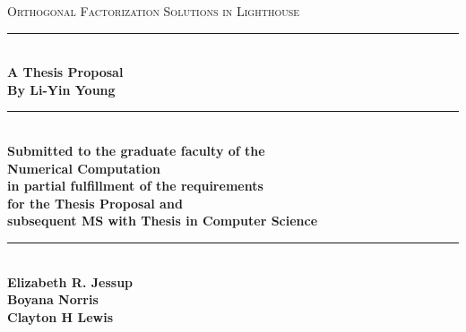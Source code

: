\documentclass[pdftex,12pt,a4paper]{article}
\newcommand{\HRule}{\rule{\linewidth}{0.2mm}}
\begin{document}
   \begin{titlepage}
        \begin{center}

\vfill
\vfill
\textsc{\Large Orthogonal Factorization Solutions in Lighthouse}\\[0.5cm]

\HRule \\[0.4cm]
{ \bfseries A Thesis Proposal \\By Li-Yin Young \\[0.3cm] }



\HRule \\[0.4cm]
{ \bfseries Submitted to the graduate faculty of the \\
Numerical Computation\\
in partial fulfillment of the requirements\\
for the Thesis Proposal and\\
 subsequent MS with Thesis in Computer Science \\[0.4cm] }


\HRule \\[0.4cm]
{\bfseries Elizabeth R. Jessup\\
Boyana Norris\\
Clayton H Lewis \\[0.4cm] }


\vfill
\end{center}
\end{titlepage}


\renewcommand*\contentsname{Outline}


\tableofcontents
\clearpage
\begin{abstract}
Orthogonal factorization are encountered in many fields and there exist different applications for different needs. My work is to add ability to find routines involved in linear least square problems and orthogonal problem to lighthouse. Linear least square problem is generally applied on observational and experimental science. The orthogonal problem in Lighthouse based on the requirement of linear least square problem. The main issues are  challenge is to find finding the right routine and to optimize its implementation. In this thesis I will tackle these issues work on overcoming this challenge by connecting the LAPACK software package with Lighthouse interface such that optimum orthogonal solutions are provided for user?s specific needs. This document explains the research approach, work completed and the proposed work to complete this thesis. 
\vfill
\end{abstract}
\clearpage
\end{document}
